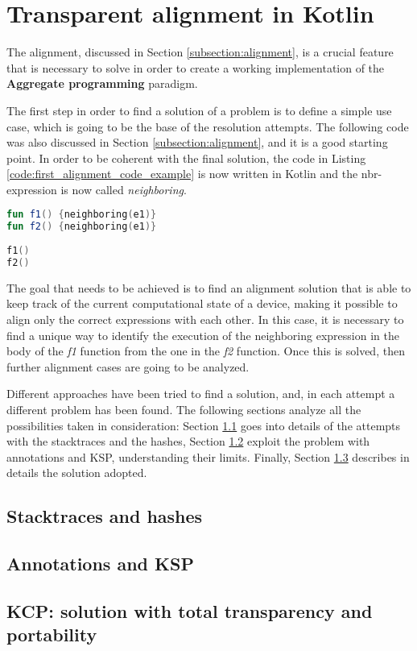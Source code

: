\chapter{Transparent alignment in Kotlin}\label{chapter:alignment}
The alignment, discussed in Section \ref{subsection:alignment}, is a crucial feature that is necessary to solve in order to create a working implementation of the \textbf{Aggregate programming} paradigm. 

The first step in order to find a solution of a problem is to define a simple use case, which is going to be the base of the resolution attempts. The following code was also discussed in Section \ref{subsection:alignment}, and it is a good starting point. In order to be coherent with the final solution, the code in Listing \ref{code:first_alignment_code_example} is now written in Kotlin and the nbr-expression is now called \textit{neighboring}.
\begin{lstlisting}[caption={Starting point to resolve the alignment problem}, captionpos=b, language=Kotlin, label={code:first_alignment_code_example}]
fun f1() {neighboring(e1)}
fun f2() {neighboring(e1)}
        
f1()
f2()
\end{lstlisting}
The goal that needs to be achieved is to find an alignment solution that is able to keep track of the current computational state of a device, making it possible to align only the correct expressions with each other. In this case, it is necessary to find a unique way to identify the execution of the neighboring expression in the body of the \textit{f1} function from the one in the \textit{f2} function.\newline
Once this is solved, then further alignment cases are going to be analyzed.

Different approaches have been tried to find a solution, and, in each attempt a different problem has been found. The following sections analyze all the possibilities taken in consideration: Section \ref{section:stacktraces_hashes} goes into details of the attempts with the stacktraces and the hashes, Section \ref{section_annotation_ksp} exploit the problem with annotations and KSP, understanding their limits. Finally, Section \ref{section:compiler_plugin_solution} describes in details the solution adopted.

\section{Stacktraces and hashes}\label{section:stacktraces_hashes}



\section{Annotations and KSP}\label{section_annotation_ksp}
\section{KCP: solution with total transparency and portability}\label{section:compiler_plugin_solution}